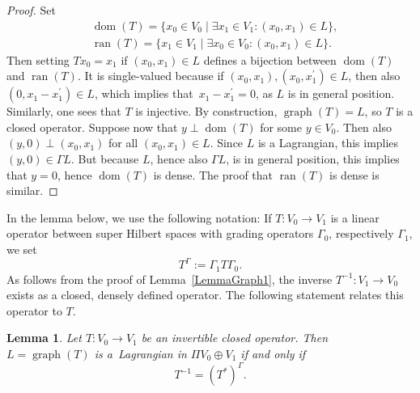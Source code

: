 \documentclass[10pt,a4paper]{amsart}
\numberwithin{equation}{section}
\newtheorem{Lemma}[Theorem]{Lemma}
\DeclareMathOperator*{\ran}{ran}
\DeclareMathOperator{\dom}{\mathrm{dom}}
\DeclareMathOperator{\graph}{\mathrm{graph}}
\begin{document}
\begin{proof}
Set
\begin{align*}
&\dom(T) = \{x_0 \in V_0 \mid \exists x_1 \in V_1\colon (x_0, x_1) \in L\}, \\
&\ran(T) = \{x_1\in V_1 \mid \exists x_0 \in V_0\colon (x_0, x_1) \in L\}.
\end{align*}
Then setting $Tx_0 = x_1$ if $(x_0, x_1) \in L$ defines a bijection between $\dom(T)$ and $\ran(T)$.
It is single-valued because if $(x_0, x_1), (x_0, x_1^\prime) \in L$, then also $(0, x_1 - x_1^\prime)\in L$, which implies that~${x_1 - x_1^\prime = 0}$, as $L$ is in general position.
Similarly, one sees that $T$ is injective.
By construction, ${\graph(T) = L}$, so $T$ is a closed operator.
Suppose now that $y \perp \dom(T)$ for some $y \in V_0$.
Then also $(y, 0) \perp (x_0, x_1)$ for all $(x_0, x_1) \in L$.
Since $L$ is a Lagrangian, this implies $(y, 0) \in \Gamma{L}$.
But because ${L}$, hence also $\Gamma{L}$, is in general position, this implies that $y=0$, hence $\dom(T)$ is dense.
The proof that $\ran(T)$ is dense is similar.
\end{proof}

In the lemma below, we use the following notation:
If $T\colon V_0 \to V_1$ is a linear operator between super Hilbert spaces with grading operators $\Gamma_0$, respectively $\Gamma_1$, we set
\begin{equation*}
 T^\Gamma := \Gamma_1 T \Gamma_0.
\end{equation*}
As follows from the proof of Lemma~\ref{LemmaGraph1}, the inverse $T^{-1}\colon V_1 \to V_0$ exists as a closed, densely defined operator.
The following statement relates this operator to $T$.

\begin{Lemma} \label{LemmaRelationTAdjointInverse}
Let $T\colon V_0 \to V_1$ be an invertible closed operator.
Then $L = \graph(T)$ is a~Lagrangian in $\Pi V_0 \oplus V_1$ if and only if
\begin{equation} \label{RelationTAdjointInverse}
 T^{-1} = (T^*)^\Gamma.
\end{equation}
\end{Lemma}
\end{document}
